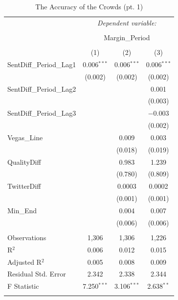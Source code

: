 \documentclass[12pt]{article}
\begin{document}
\begin{doublespacing}
\begin{table}[H] 
\centering 
\caption{The Accuracy of the Crowds (pt. 1)} 
\label{table:accuracypart1} 
\begin{tabular*}{\textwidth}{@{\extracolsep{\fill}}lccc} 
\hline 
\hline
 & \multicolumn{3}{c}{\textit{Dependent variable:}} \\ 
\cline{2-4} 
\\[-3.0ex] & \multicolumn{3}{c}{Margin\_Period} \\ 
\\[-1.5ex] & (1) & (2) & (3)\\ 
\hline
 SentDiff\_Period\_Lag1 & 0.006$^{***}$ & 0.006$^{***}$ & 0.006$^{***}$ \\ 
  & (0.002) & (0.002) & (0.002) \\ 
 SentDiff\_Period\_Lag2 &  &  & 0.001 \\ 
  &  &  & (0.003) \\ 
 SentDiff\_Period\_Lag3 &  &  & $-$0.003 \\ 
  &  &  & (0.002) \\ 
 Vegas\_Line &  & 0.009 & 0.003 \\ 
  &  & (0.018) & (0.019) \\ 
 QualityDiff &  & 0.983 & 1.239 \\ 
  &  & (0.780) & (0.809) \\ 
 TwitterDiff &  & 0.0003 & 0.0002 \\ 
  &  & (0.001) & (0.001) \\ 
 Min\_End &  & 0.004 & 0.007 \\ 
  &  & (0.006) & (0.006) \\ 
\hline \\[-1.8ex] 
Observations & 1,306 & 1,306 & 1,226 \\ 
R$^{2}$ & 0.006 & 0.012 & 0.015 \\ 
Adjusted R$^{2}$ & 0.005 & 0.008 & 0.009 \\ 
Residual Std. Error & 2.342 & 2.338 & 2.344 \\ 
F Statistic & 7.250$^{***}$ & 3.106$^{***}$ & 2.638$^{**}$ \\ 
\hline 
\hline \\[-1.8ex] 
\end{tabular*} 
\end{table} 


\end{doublespacing}
\end{document}
